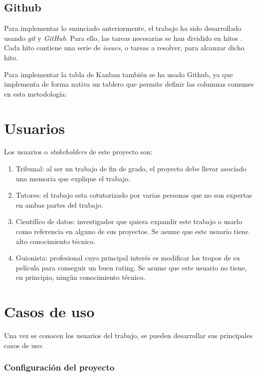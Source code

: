 \subsection{Github}

Para implementar lo enunciado anteriormente, el trabajo ha sido desarrollado usando \textit{git} y \textit{GitHub}.
Para ello, las tareas necesarias se han dividido en hitos \cite{milestones}. Cada hito contiene una
serie de \textit{issues}, o tareas a resolver, para alcanzar dicho hito.

Para implementar la tabla de Kanban también se ha usado Github, ya que implementa de forma nativa un
tablero que permite definir las columnas comunes en esta metodología:

\section{Usuarios}

Los usuarios o \textit{stakeholders} de este proyecto son:

\begin{enumerate}
      \item Tribunal: al ser un trabajo de fin de grado, el proyecto debe llevar asociado una memoria
            que explique el trabajo.
      \item Tutores: el trabajo esta cotutorizado por varias personas que no son expertas en ambas partes del trabajo.
      \item Cientifíco de datos: investigador que quiera expandir este trabajo o usarlo como
            referencia en alguno de sus proyectos. Se asume que este usuario tiene alto conocimiento técnico.
      \item Guionista: profesional cuyo principal interés es modificar los tropos de su película para
            conseguir un buen rating. Se asume que este usuario no tiene, en principio, ningún conocimiento
            técnico.
\end{enumerate}

\section{Casos de uso}

Una vez se conocen los usuarios del trabajo, se pueden desarrollar sus principales casos de uso:

\subsubsection*{Configuración del proyecto} \label{uc:configuration}

